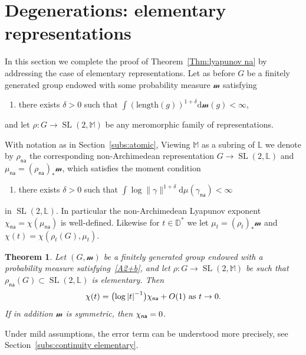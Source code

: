 \documentclass[11pt]{article}
\newtheorem{theo}{Theorem}[section]
\theoremstyle{definition}
\numberwithin{equation}{section}
\numberwithin{figure}{section}
\numberwithin{table}{section}
\DeclareMathOperator{\SL}{SL}
\newcommand{\sm}{\mathcal{m}}
\newcommand{\mm}{\mathbb{M}}
\newcommand{\D}{\mathbb{D}}
\newcommand{\cv}{\rightarrow}
\newcommand{\abs}[1]{\left\vert#1\right\vert}
\newcommand{\Laurent}{\mathbb{L}}
\newcommand{\na}{\mathsf{na}}
\newcommand{\inv}{^{-1}}
\newcommand*{\dd}{\mathrm{d}}
\newcommand*{\dmu}{\dd \mu}
\newcommand*{\dsm}{\dd \sm}
\begin{document}
\section{Degenerations: elementary representations}\label{sec:elem}

In this section we complete the proof of Theorem~\ref{Thm:lyapunov na} by addressing the case of elementary representations. Let as before $G$ be a finitely generated group endowed with some probability measure $\sm$ satisfying
\begin{enumerate}\renewcommand*{\theenumi}{A\arabic{enumi}${}^+$}\setcounter{enumi}{1}
\item \label{A2+b} there exists $\delta>0$ such that $\int (\mathrm{length}(g))^{1+\delta} \dsm(g)<\infty$,
\end{enumerate}
and let $\rho :G\to \SL(2, \mm)$ be any meromorphic family of representations.

With notation as in Section~\ref{subs:atomic}, Viewing $\mm$ as a subring of $\Laurent$ we denote by $\rho_\na$ the corresponding non-Archimedean representation $G\to \SL(2, \Laurent)$ and $\mu_\na = (\rho_\na)_* \sm$, which satisfies the moment condition
\begin{enumerate}\renewcommand*{\theenumi}{B\arabic{enumi}${}^+$}\setcounter{enumi}{1}
\item \label{B2+b} there exists $\delta>0$ such that $\int \log \|\gamma\|^{1+\delta} \dmu(\gamma_\na)<\infty$
\end{enumerate}
in $\SL(2, \Laurent)$. In particular the non-Archimedean Lyapunov exponent $\chi_\na = \chi(\mu_\na)$ is well-defined. Likewise for $t\in \D^*$ we let $\mu_t = (\rho_t)_* \sm$ and $\chi(t) = \chi(\rho_t(G), \mu_t)$.

\begin{theo} \label{thm:degeneration elementary}
Let $(G, \sm)$ be a finitely generated group endowed with a probability measure satisfying~\eqref{A2+b}, and let $\rho: G\to \SL(2, \mm)$ be such that $ \rho_\na(G) \subset \SL(2,\Laurent)$ is elementary. Then
\begin{equation}\label{eq:lyapunov elementary}
\chi(t) = \big({\log\abs{t}\inv} \big) \chi_{\sf na} + O(1) \text{ as } t\cv 0.
\end{equation}
If in addition $\sm$ is symmetric, then $\chi_{\sf na} = 0$.
\end{theo}

Under mild assumptions, the error term can be understood more precisely, see Section~\ref{subs:continuity elementary}.
\end{document}
